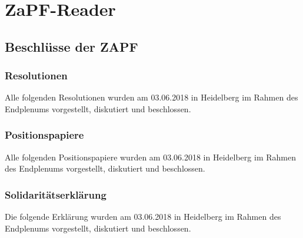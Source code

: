 \documentclass[ngerman, 11pt, openany]{scrbook}
\begin{document}

\newpage
\setcounter{tocdepth}{1} %
\small\tableofcontents
\normalsize

\newpage
\part{ZaPF-Reader}

\chapter{Beschlüsse der ZAPF}
  \section{Resolutionen}
    Alle folgenden Resolutionen wurden am 03.06.2018 in Heidelberg im Rahmen des Endplenums
    vorgestellt, diskutiert und beschlossen.
    \begin{resofont}
      
      
      
      
      
      
      
      
      
    \end{resofont}

  \section{Positionspapiere}
    Alle folgenden Positionspapiere wurden am 03.06.2018 in Heidelberg im Rahmen des Endplenums
    vorgestellt, diskutiert und beschlossen.
    \begin{resofont}
      
      
      
    \end{resofont}

  \section{Solidaritätserklärung}
    Die folgende Erklärung wurden am 03.06.2018 in Heidelberg im Rahmen des Endplenums
    vorgestellt, diskutiert und beschlossen.
    \begin{resofont}
      
    \end{resofont}
\end{document}
